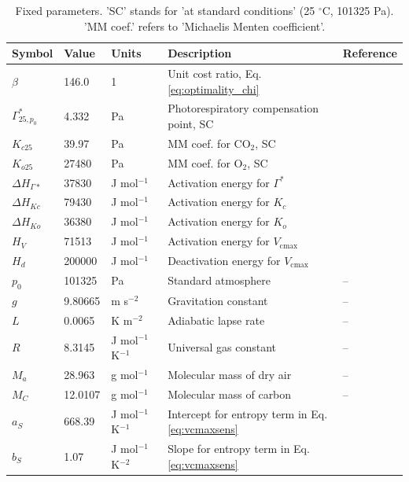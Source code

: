 \documentclass{myreport}
\newcommand{\vcmax}{$V_{\text{cmax}}$}
\begin{document}
\begin{table}
\centering
\begin{tabular}{lllll}
	\toprule
    Symbol     & Value   & Units         & Description           &  Reference   \\
	\midrule
    $\beta$      & 146.0     & 1             & Unit cost ratio, Eq. \ref{eq:optimality_chi} & \cite{Wang2017-ls} \\
	$\Gamma^\ast_{25, p_0}$ & 4.332 & Pa & Photorespiratory compensation point, SC & \cite{bernacchi01} \\
	$K_{c25}$    & 39.97   & Pa            & MM coef. for CO$_2$, SC&  \cite{bernacchi01} \\
	$K_{o25}$    & 27480   & Pa            & MM coef. for O$_2$, SC&  \cite{bernacchi01} \\
	$\Delta H_{\Gamma\ast}$ & 37830 & J mol$^{-1}$ & Activation energy for $\Gamma^\ast$  & \cite{bernacchi01} \\
	$\Delta H_{Kc}$ & 79430  & J mol$^{-1}$  & Activation energy for $K_c$&  \cite{bernacchi01} \\
	$\Delta H_{Ko}$ & 36380  & J mol$^{-1}$  & Activation energy for $K_o$&  \cite{bernacchi01} \\
	$H_V$        & 71513   & J mol$^{-1}$  & Activation energy for \vcmax\ & \cite{kattge07} \\
	$H_d$        & 200000   & J mol$^{-1}$  & Deactivation energy for \vcmax\ & \cite{kattge07} \\
	$p_0$        & 101325  & Pa            & Standard atmosphere   & -- \\
	$g$          & 9.80665 & m s$^{-2}$    & Gravitation constant  & -- \\
	$L$          & 0.0065  & K m$^{-2}$    & Adiabatic lapse rate  & -- \\
	$R$          & 8.3145  & J mol$^{-1}$ K$^{-1}$ & Universal gas constant & -- \\
	$M_a$        & 28.963  & g mol$^{-1}$  & Molecular mass of dry air & -- \\
    $M_C$        & 12.0107 & g mol$^{-1} $ & Molecular mass of carbon & -- \\ 
	$a_S$        & 668.39  & J mol$^{-1}$ K$^{-1}$ & Intercept for entropy term in Eq. \ref{eq:vcmaxsens} & \cite{kattge07} \\
	$b_S$        & 1.07  & J mol$^{-1}$ K$^{-2}$ & Slope for entropy term in Eq. \ref{eq:vcmaxsens} & \cite{kattge07} \\
	\bottomrule
\end{tabular}
\caption{Fixed parameters. 'SC' stands for 'at standard conditions' (25 $^{\circ}$C, 101325 Pa). 'MM coef.' refers to 'Michaelis Menten coefficient'.}
\label{tab:params}
\end{table}
\end{document}
